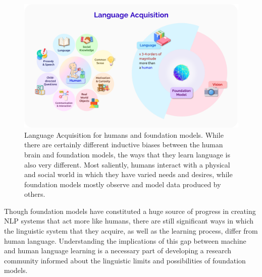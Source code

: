\begin{figure}[t]
\centering
\includegraphics[width=\textwidth]{capabilities/figures/Language_2.png}
\caption{\label{fig:language_2}
Language Acquisition for humans and foundation models. While there are certainly different inductive biases between the human brain and foundation models, the ways that they learn language is also very different. Most saliently, humans interact with a physical and social world in which they have varied needs and desires, while foundation models mostly observe and model data produced by others.}
\end{figure}

Though foundation models have constituted a huge source of progress in creating NLP systems that act more like humans, there are still significant ways in which the linguistic system that they acquire, as well as the learning process, differ from human language. Understanding the implications of this gap between machine and human language learning is a necessary part of developing a research community informed about the linguistic limits and possibilities of foundation models.

